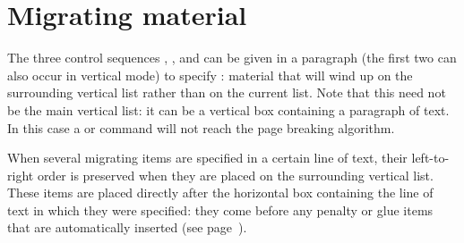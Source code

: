 \documentclass[twoside,letterpaper,openright]{rapport3}
\begin{document}
\section{Migrating material}
\label{migrate}

The three control sequences , , and 
can be given in a paragraph 
(the first two can also occur
in vertical mode) to specify :
material that will wind up on the
surrounding vertical list rather than on the current list.
Note that this need not be 
the main vertical list: it can be a vertical box
containing a paragraph of text. In this case a 
or  command will not reach the page breaking algorithm.

When several migrating items are specified in a certain line
of text, their left-to-right order is preserved when they are
placed on the surrounding vertical list. These items are placed
directly after the horizontal box containing the line of text
in which they were specified: they come before any
penalty or glue items that are automatically inserted
(see page~\pageref{between:lines}).

\end{document}
